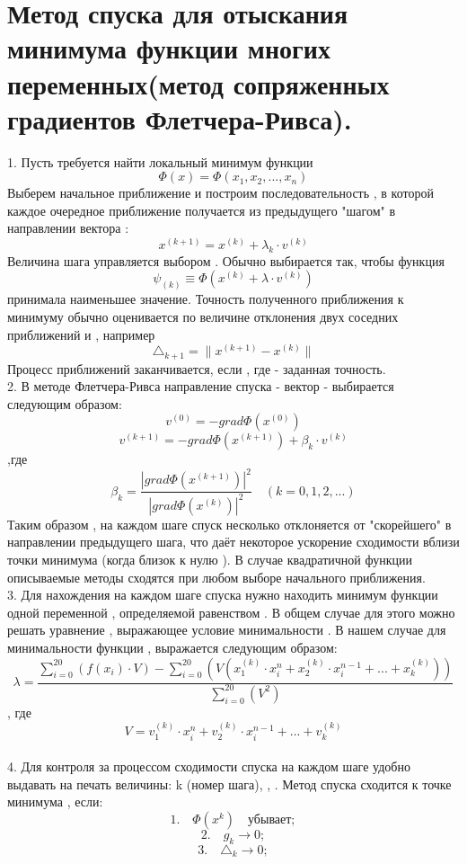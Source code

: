 \documentclass{article}
\begin{document}
\section{Метод спуска для отыскания минимума функции многих переменных(метод сопряженных градиентов Флетчера-Ривса).}
\text{$\quad$}1. Пусть требуется найти локальный минимум функции \[ \Phi(x) = \Phi(x_{1},x_{2}, ... ,x_{n})\] 
Выберем начальное приближение  и построим последовательность 
, в которой каждое очередное приближение 
 получается из предыдущего  "шагом" в направлении вектора : \[ x^{(k+1)} = x^{(k)} + \lambda_{k}\cdot v^{(k)} \]
Величина шага управляется выбором . Обычно  выбирается 
так, чтобы функция \[ \psi_{(k)} \equiv \Phi(x^{(k)} + \lambda\cdot v^{(k)}) \]
принимала наименьшее значение. 
Точность полученного приближения к минимуму обычно оценивается по величине отклонения двух соседних приближений  и 
 , например \[\triangle_{k+1} = \lVert x^{(k+1)}-x^{(k)}\rVert\] 
Процесс приближений заканчивается, если , где \text{$\varepsilon$} - заданная точность. \\
\text{$\quad$}2. В методе Флетчера-Ривса направление спуска - вектор  - выбирается следующим образом:
\[ v^{(0)} = -grad\Phi(x^{(0)})\]
\[ v^{(k+1)} = -grad\Phi(x^{(k+1)}) + \beta_{k}\cdot v^{(k)}\] ,где
\[ \beta_{k} = \frac{|grad\Phi(x^{(k+1)})|^2}{|grad\Phi(x^{(k)})|^2} \quad (k = 0,1,2,...)\] 
Таким образом , на каждом шаге спуск несколько отклоняется от "скорейшего" в направлении предыдущего шага, что даёт 
некоторое ускорение сходимости вблизи точки минимума (когда близок к нулю ). 
В случае квадратичной функции  описываемые методы сходятся при любом выборе начального приближения. \\ 
\text{$\quad$}3. Для нахождения  на каждом шаге спуска нужно находить минимум функции одной переменной , определяемой равенством .
В общем случае для этого можно решать уравнение , выражающее условие минимальности . 
В нашем случае для минимальности функции  , \text{$\lambda $} выражается следующим образом:
\[\lambda = \frac{\sum_{i=0}^{20}(f(x_{i})\cdot V) - \sum_{i=0}^{20}(V( x_{1}^{(k)}\cdot x_{i}^{n} + x_{2}^{(k)}\cdot x_{i}^{n-1} + ... + x^{(k)}_{k} ))}{\sum_{i=0}^{20}(V^2)}\] , где 
\[ V = v_{1}^{(k)}\cdot x_{i}^{n} + v_{2}^{(k)}\cdot x_{i}^{n-1} + ... + v_{k}^{(k)}\] \\
\text{$\quad$}4. Для контроля за процессом сходимости спуска на каждом шаге удобно выдавать на печать величины:
k (номер шага),\text{$\quad$}  , \text{$\quad$} . Метод спуска сходится к точке минимума , если: 
\[ 1. \quad\Phi(x^{k})\quad\text{убывает};\] 
\[ 2. \quad\text{$g_{k} \to 0$};\] 
\[ 3. \quad\triangle_{k} \to 0;\]
\newpage
\end{document}
